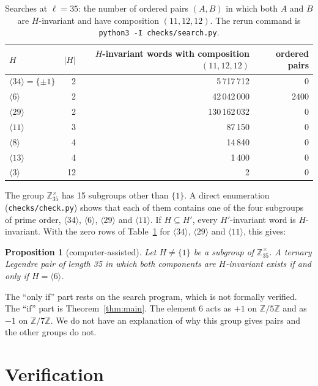 \documentclass[11pt]{article}
\newtheorem{proposition}[theorem]{Proposition}
\theoremstyle{remark}
\newcommand{\Z}{\mathbb{Z}}
\begin{document}
\begin{table}[t]
\centering
\begin{tabular}{lrrr}
\toprule
$H$ & $|H|$ & $H$-invariant words with composition $(11,12,12)$ & ordered pairs \\
\midrule
$\langle 34\rangle = \{\pm 1\}$ & 2 & 5\,717\,712 & 0 \\
$\langle 6\rangle$ & 2 & 42\,042\,000 & 2400 \\
$\langle 29\rangle$ & 2 & 130\,162\,032 & 0 \\
$\langle 11\rangle$ & 3 & 87\,150 & 0 \\
$\langle 8\rangle$ & 4 & 14\,840 & 0 \\
$\langle 13\rangle$ & 4 & 1\,400 & 0 \\
$\langle 3\rangle$ & 12 & 2 & 0 \\
\bottomrule
\end{tabular}
\caption{Searches at $\ell = 35$: the number of ordered pairs $(A, B)$ in which both $A$ and $B$ are $H$-invariant and have composition $(11, 12, 12)$. The rerun command is \texttt{python3 -I checks/search.py}.}
\label{tab:search}
\end{table}

The group $\Z_{35}^\times$ has 15 subgroups other than $\{1\}$. A direct enumeration (\texttt{checks/check.py}) shows that each of them contains one of the four subgroups of prime order, $\langle 34\rangle$, $\langle 6\rangle$, $\langle 29\rangle$ and $\langle 11\rangle$. If $H \subseteq H'$, every $H'$-invariant word is $H$-invariant. With the zero rows of Table~\ref{tab:search} for $\langle 34\rangle$, $\langle 29\rangle$ and $\langle 11\rangle$, this gives:

\begin{proposition}[computer-assisted]\label{prop:only6}
Let $H \ne \{1\}$ be a subgroup of $\Z_{35}^\times$. A ternary Legendre pair of length 35 in which both components are $H$-invariant exists if and only if $H = \langle 6 \rangle$.
\end{proposition}

The ``only if'' part rests on the search program, which is not formally verified. The ``if'' part is Theorem~\ref{thm:main}. The element 6 acts as $+1$ on $\Z/5\Z$ and as $-1$ on $\Z/7\Z$. We do not have an explanation of why this group gives pairs and the other groups do not.

\section{Verification}
\end{document}
